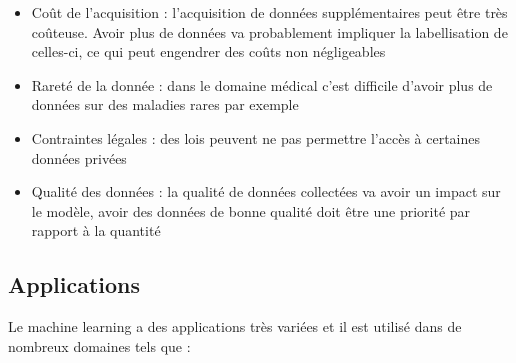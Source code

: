\begin{itemize}
    \item Coût de l'acquisition : l'acquisition de données supplémentaires peut être très coûteuse. Avoir plus de données va probablement impliquer la labellisation de celles-ci, ce qui peut engendrer des coûts non négligeables
    \item Rareté de la donnée : dans le domaine médical c'est difficile d'avoir plus de données sur des maladies rares par exemple
    \item Contraintes légales : des lois peuvent ne pas permettre l'accès à certaines données privées
    
    \item Qualité des données : la qualité de données collectées va avoir un impact sur le modèle, avoir des données de bonne qualité doit être une priorité par rapport à la quantité
\end{itemize}


\subsection{Applications}

\par{Le machine learning a des applications très variées et il est utilisé dans de nombreux domaines tels que :}

